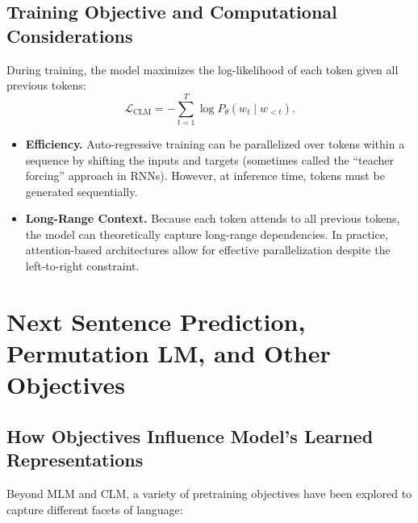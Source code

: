 \subsection{Training Objective and Computational Considerations}
\noindent
During training, the model maximizes the log-likelihood of each token given all previous tokens:
\[
\mathcal{L}_\text{CLM} = - \sum_{t=1}^{T} \log P_{\theta}(w_t \mid w_{<t}).
\]
\begin{itemize}
    \item \textbf{Efficiency.}
    Auto-regressive training can be parallelized over tokens within a sequence by shifting the inputs and targets (sometimes called the “teacher forcing” approach in RNNs). However, at inference time, tokens must be generated sequentially.
    \item \textbf{Long-Range Context.}
    Because each token attends to all previous tokens, the model can theoretically capture long-range dependencies. In practice, attention-based architectures allow for effective parallelization despite the left-to-right constraint.
\end{itemize}


\section{Next Sentence Prediction, Permutation LM, and Other Objectives}
\label{sec:other_obj}

\subsection{How Objectives Influence Model’s Learned Representations}
\noindent
Beyond MLM and CLM, a variety of pretraining objectives have been explored to capture different facets of language:


